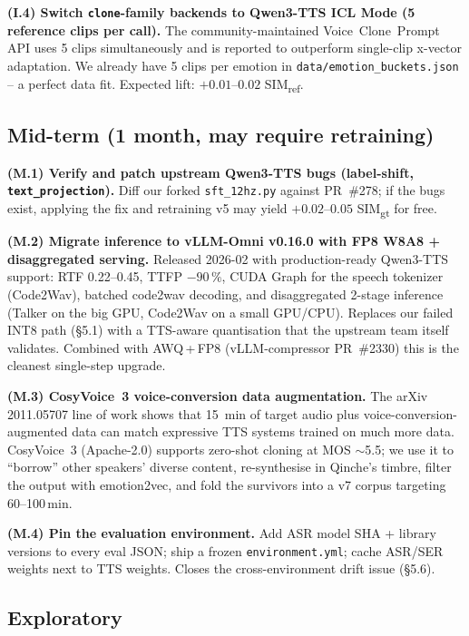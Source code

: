 \documentclass[10pt,a4paper]{article}
\begin{document}
\noindent\textbf{(I.4) Switch \texttt{clone}-family backends to Qwen3-TTS
ICL Mode (5 reference clips per call).}
The community-maintained Voice~Clone~Prompt API uses 5 clips simultaneously
and is reported to outperform single-clip x-vector adaptation. We already
have 5 clips per emotion in \texttt{data/emotion\_buckets.json} -- a perfect
data fit. Expected lift: $+0.01$--$0.02$ SIM\textsubscript{ref}.

\subsection{Mid-term (1 month, may require retraining)}

\noindent\textbf{(M.1) Verify and patch upstream Qwen3-TTS bugs
(label-shift, \texttt{text\_projection}). }
Diff our forked \texttt{sft\_12hz.py} against PR~\#278; if the bugs
exist, applying the fix and retraining v5 may yield $+0.02$--$0.05$
SIM\textsubscript{gt} for free.

\noindent\textbf{(M.2) Migrate inference to vLLM-Omni v0.16.0 with FP8 W8A8
+ disaggregated serving.}
Released 2026-02 with production-ready Qwen3-TTS support: RTF
0.22--0.45, TTFP $-90\,\%$, CUDA Graph for the speech tokenizer
(Code2Wav), batched code2wav decoding, and disaggregated 2-stage inference
(Talker on the big GPU, Code2Wav on a small GPU/CPU). Replaces our failed
INT8 path (\S5.1) with a TTS-aware quantisation that the upstream team
itself validates. Combined with AWQ\,+\,FP8 (vLLM-compressor PR~\#2330)
this is the cleanest single-step upgrade.

\noindent\textbf{(M.3) CosyVoice~3 voice-conversion data augmentation.}
The arXiv 2011.05707 line of work shows that 15~min of target audio plus
voice-conversion-augmented data can match expressive TTS systems trained
on much more data. CosyVoice~3 (Apache-2.0) supports zero-shot cloning at
MOS $\sim$5.5; we use it to ``borrow'' other speakers' diverse content,
re-synthesise in Qinche's timbre, filter the output with emotion2vec, and
fold the survivors into a v7 corpus targeting 60--100\,min.

\noindent\textbf{(M.4) Pin the evaluation environment.}
Add ASR model SHA + library versions to every eval JSON; ship a frozen
\texttt{environment.yml}; cache ASR/SER weights next to TTS weights.
Closes the cross-environment drift issue (\S5.6).

\subsection{Exploratory}
\end{document}
